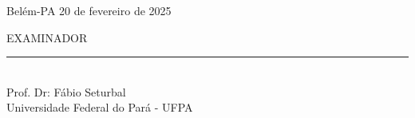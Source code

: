 \begin{center}
\begin{minipage}{7cm}
	Belém-PA 20 de fevereiro de 2025
	\vspace{4cm}
\end{minipage}

\onehalfspacing
\begin{center}

	EXAMINADOR\\
	\vspace{3cm}
	\rule{10cm}{0.15mm} \\
	Prof. Dr: Fábio Seturbal\\
	Universidade Federal do Pará - UFPA
\end{center}
\newpage

\begin{center}
    \thispagestyle{empty}
	\listoffigures
	\newpage
    \thispagestyle{empty}
    \tableofcontents

\end{center}

\newpage
\thispagestyle{empty}

\end{center}